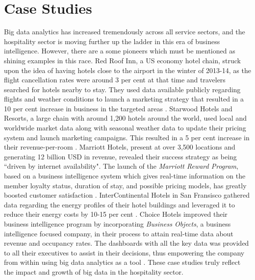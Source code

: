 \documentclass[sigconf]{acmart}
\begin{document}
\section{Case Studies}
Big data analytics has increased tremendously across all service sectors, and the hospitality sector is moving further up the ladder in this era of business intelligence. However, there are a some pioneers which must be mentioned as shining examples in this race. Red Roof Inn, a US economy hotel chain, struck upon the idea of having hotels close to the airport in the winter of 2013-14, as the flight cancellation rates were around 3 per cent at that time and travelers searched for hotels nearby to stay. They used data available publicly regarding flights and weather conditions to launch a marketing strategy that resulted in a 10 per cent increase in business in the targeted areas \cite {bmarr06}. Starwood Hotels and Resorts, a large chain with around 1,200 hotels around the world, used local and worldwide market data along with seasonal weather data to update their pricing system and launch marketing campaigns. This resulted in a 5 per cent increase in their revenue-per-room \cite {bmarr06}. Marriott Hotels, present at over 3,500 locations and generating 12 billion USD in revenue, revealed their success strategy as being ``driven by internet availability". The launch of the {\em Marriott Reward Program}, based on a business intelligence system which gives real-time information on the member loyalty status, duration of stay, and possible pricing models, has greatly boosted customer satisfaction \cite {kortefrolick03}. InterContinental Hotels in San Fransisco gathered data regarding the energy profiles of their hotel buildings and leveraged it to reduce their energy costs by 10-15 per cent \cite {hotelanalytics14}. Choice Hotels improved their business intelligence program by incorporating {\em Business Objects}, a business intelligence focused company, in their process to attain real-time data about revenue and occupancy rates. The dashboards with all the key data was provided to all their executives to assist in their decisions, thus empowering the company from within using big data analytics as a tool \cite {kortefrolick03}. These case studies truly reflect the impact and growth of big data in the hospitality sector.
\end{document}
